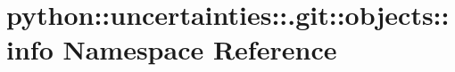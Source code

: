 \hypertarget{namespacepython_1_1uncertainties_1_1_8git_1_1objects_1_1info}{
\section{python::uncertainties::.git::objects::info Namespace Reference}
\label{namespacepython_1_1uncertainties_1_1_8git_1_1objects_1_1info}
}
